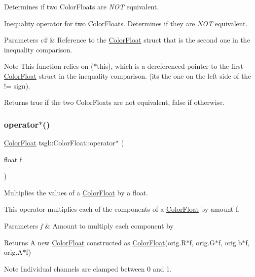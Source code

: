 Determines if two Color\+Floats are {\itshape N\+OT} equivalent. 

Inequality operator for two Color\+Floats. Determines if they are {\itshape N\+OT} equivalent. 
\begin{DoxyParams}{Parameters}
{\em c2} & Reference to the \hyperlink{structtsgl_1_1_color_float}{Color\+Float} struct that is the second one in the inequality comparison. \\
\hline
\end{DoxyParams}
\begin{DoxyNote}{Note}
This function relies on ($\ast$this), which is a dereferenced pointer to the first \hyperlink{structtsgl_1_1_color_float}{Color\+Float} struct in the inequality comparison. (its the one on the left side of the != sign). 
\end{DoxyNote}
\begin{DoxyReturn}{Returns}
true if the two Color\+Floats are not equivalent, false if otherwise. 
\end{DoxyReturn}
\mbox{\label{structtsgl_1_1_color_float_a09d7cc47ac3d0e23ef7339ccf33111a5}} 
\subsubsection{\texorpdfstring{operator$\ast$()}{operator*()}}
{\footnotesize\ttfamily \hyperlink{structtsgl_1_1_color_float}{Color\+Float} tsgl\+::\+Color\+Float\+::operator$\ast$ (\begin{DoxyParamCaption}\item[{float}]{f }\end{DoxyParamCaption})}



Multiplies the values of a \hyperlink{structtsgl_1_1_color_float}{Color\+Float} by a float. 

This operator multiplies each of the components of a \hyperlink{structtsgl_1_1_color_float}{Color\+Float} by amount {\ttfamily f}. 
\begin{DoxyParams}{Parameters}
{\em f} & Amount to multiply each component by \\
\hline
\end{DoxyParams}
\begin{DoxyReturn}{Returns}
A new \hyperlink{structtsgl_1_1_color_float}{Color\+Float} constructed as \hyperlink{structtsgl_1_1_color_float}{Color\+Float}(orig.\+R$\ast$f, orig.\+G$\ast$f, orig.\+b$\ast$f, orig.\+A$\ast$f) 
\end{DoxyReturn}
\begin{DoxyNote}{Note}
Individual channels are clamped between 0 and 1. 
\end{DoxyNote}
\mbox{\label{structtsgl_1_1_color_float_ac29ecf4a36624050af433d691e65651c}} 
